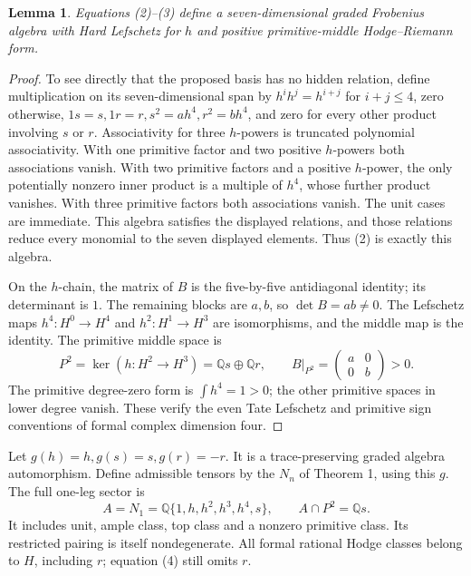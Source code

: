 \documentclass[11pt]{article}
\newcommand{\Q}{\mathbb Q}
\newtheorem{lemma}[theorem]{Lemma}
\begin{document}
\begin{lemma}
Equations (2)--(3) define a seven-dimensional graded Frobenius
algebra with Hard Lefschetz for \(h\) and positive primitive-middle
Hodge--Riemann form.
\end{lemma}
\begin{proof}
To see directly that the proposed basis has no hidden relation, define
multiplication on its seven-dimensional span by
\(h^ih^j=h^{i+j}\) for \(i+j\leq4\), zero otherwise,
\(1s=s,1r=r,s^2=ah^4,r^2=bh^4\), and zero for every other
product involving \(s\) or \(r\).
Associativity for three \(h\)-powers is truncated polynomial
associativity. With one primitive factor and two positive \(h\)-powers
both associations vanish. With two primitive factors and a positive
\(h\)-power, the only potentially nonzero inner product is a multiple
of \(h^4\), whose further product vanishes. With three primitive
factors both associations vanish. The unit cases are immediate.
This algebra satisfies the displayed relations, and those relations
reduce every monomial to the seven displayed elements. Thus (2) is
exactly this algebra.

On the \(h\)-chain, the matrix of \(B\) is the five-by-five
antidiagonal identity; its determinant is \(1\).
The remaining blocks are \(a,b\), so \(\det B=ab\ne0\).
The Lefschetz maps \(h^4:H^0\to H^4\) and
\(h^2:H^1\to H^3\) are isomorphisms, and the middle map is the
identity. The primitive middle space is
\[
 P^2=\ker(h:H^2\to H^3)=\Q s\oplus\Q r,\qquad
 B|_{P^2}=\begin{pmatrix}a&0\\0&b\end{pmatrix}>0.
\]
The primitive degree-zero form is \(\int h^4=1>0\);
the other primitive spaces in lower degree vanish.
These verify the even Tate Lefschetz and primitive sign conventions
of formal complex dimension four.
\end{proof}

Let \(g(h)=h,g(s)=s,g(r)=-r\). It is a trace-preserving graded
algebra automorphism. Define admissible tensors by the \(N_n\) of
Theorem 1, using this \(g\). The full one-leg sector is
\[
 A=N_1=\Q\{1,h,h^2,h^3,h^4,s\},\qquad
 A\cap P^2=\Q s.                                             \tag{4}
\]
It includes unit, ample class, top class and a nonzero primitive
class. Its restricted pairing is itself nondegenerate.
All formal rational Hodge classes belong to \(H\), including \(r\);
equation (4) still omits \(r\).
\end{document}

